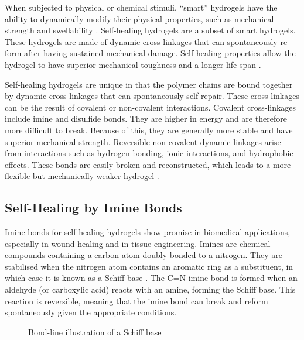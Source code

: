 When subjected to physical or chemical stimuli, ``smart'' hydrogels have the ability to dynamically modify their physical properties, such as mechanical strength and swellability \autocite{hoHydrogelsPropertiesApplications2022}.
Self-healing hydrogels are a subset of smart hydrogels. These hydrogels are made of dynamic cross-linkages that can spontaneously re-form after having sustained mechanical damage. Self-healing properties allow the hydrogel to have superior mechanical toughness and a longer life span \autocite{deviv.k.SelfHealingHydrogelsPreparation2021}.

Self-healing hydrogels are unique in that the polymer chains are bound together by dynamic cross-linkages that can spontaneously self-repair. These cross-linkages can be the result of covalent or non-covalent interactions.
Covalent cross-linkages include imine and disulfide bonds. They are higher in energy and are therefore more difficult to break. Because of this, they are generally more stable and have superior mechanical strength.
Reversible non-covalent dynamic linkages arise from interactions such as hydrogen bonding, ionic interactions, and hydrophobic effects. These bonds are easily broken and reconstructed, which leads to a more flexible but mechanically weaker hydrogel \autocite{deviv.k.SelfHealingHydrogelsPreparation2021}.

\subsection{Self-Healing by Imine Bonds}

Imine bonds for self-healing hydrogels show promise in biomedical applications, especially in wound healing and in tissue engineering. Imines are chemical compounds containing a carbon atom doubly-bonded to a nitrogen. They are stabilised when the nitrogen atom contains an aromatic ring as a substituent, in which case it is known as a Schiff base \autocite{moldoveanuChapter8Pyrolysis2019}.
The C=N imine bond is formed when an aldehyde (or carboxylic acid) reacts with an amine, forming the Schiff base. This reaction is reversible, meaning that the imine bond can break and reform spontaneously given the appropriate conditions.

\begin{figure}[ht]
    \centering
    \caption{Bond-line illustration of a Schiff base}
    \label{fig:schiff_base}
\end{figure}